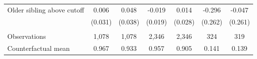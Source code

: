 {{\begin{tabular}{lcccccc}
Older sibling above cutoff&       0.006   &       0.048   &      -0.019   &       0.014   &      -0.296   &      -0.047   \\
                    &     (0.031)   &     (0.038)   &     (0.019)   &     (0.028)   &     (0.262)   &     (0.261)   \\
                    &               &               &               &               &               &               \\
Observations        &       1,078   &       1,078   &       2,346   &       2,346   &         324   &         319   \\
Counterfactual mean &       0.967   &       0.933   &       0.957   &       0.905   &       0.141   &       0.139   \\
 

\bottomrule
\end{tabular}
}
}

